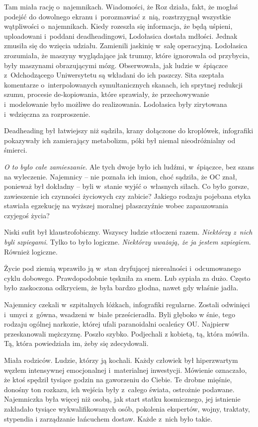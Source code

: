 \documentclass[oneside,polish,11pt,sfheadings]{mwbk}
\begin{document}
Tam miała rację o~najemnikach. Wiadomości, że Roz działa, fakt, że
mogłaś podejść do dowolnego ekranu i~porozmawiać z~nią, rozstrzygnął
wszystkie wątpliwości o~najemnikach. Kiedy rozeszła się informacja, że
będą uśpieni, uploadowani i~poddani deadheadingowi, Lodołasica dostała
mdłości. Jednak zmusiła się do wzięcia udziału. Zamienili jaskinię w~salę operacyjną. Lodołasica zrozumiała, że maszyny wyglądające jak
trumny, które ignorowała od przybycia, były maszynami obrazującymi mózg.
Obserwowała, jak ludzie w~śpiączce z~Odchodzącego Uniwersytetu są
wkładani do ich paszczy. Sita szeptała komentarze o~interpolowanych
symultanicznych skanach, ich sprytnej redukcji szumu, procesie
de-kopiowania, które sprawiały, że przechowywanie i~modelowanie było
możliwe do realizowania. Lodołasica były zirytowana i~wdzięczna za
rozproszenie.

Deadheading był łatwiejszy niż sądziła, krany dołączone do kroplówek,
infografiki pokazywały ich zamierający metabolizm, póki był niemal
nieodróżnialny od śmierci.

\textit{O to było całe zamieszanie}. Ale tych dwoje było ich ludźmi, w~śpiączce, bez szans na wyleczenie. Najemnicy -- nie poznała ich imion,
choć sądziła, że OC znał, ponieważ był dokładny -- byli w~stanie wyjść o~własnych siłach. Co było gorsze, zawieszenie ich czynności życiowych czy
zabicie? Jakiego rodzaju pojebana etyka stawiała egzekucję na wyższej
moralnej płaszczyźnie wobec zapauzowania czyjegoś życia?

Niski sufit był klaustrofobiczny. Wszyscy ludzie stłoczeni razem.
\textit{Niektórzy z~nich byli szpiegami}. Tylko to było logiczne.
\textit{Niektórzy uważają, że ja jestem szpiegiem}. Również logiczne.

Życie pod ziemią wprawiło ją w~stan dryfującej nierealności i~odcumowanego cyklu dobowego. Prawdopodobnie tęskniła za snem. Lub
sypiała za dużo. Często było zaskoczona odkryciem, że była bardzo
głodna, nawet gdy właśnie jadła.

Najemnicy czekali w~szpitalnych łóżkach, infografiki regularne. Zostali
odwinięci i~umyci z~gówna, wsadzeni w~białe prześcieradła. Byli głęboko
w śnie, tego rodzaju ogólnej narkozie, której ufali paranoidalni
ocaleńcy OU. Najpierw przeskanowali mężczyznę. Poszło szybko. Podjechali
z kobietą, tą, która mówiła. Tą, która powiedziała im, żeby się
zdecydowali.

Miała rodziców. Ludzie, którzy ją kochali. Każdy człowiek był
hiperzwartym węzłem intensywnej emocjonalnej i~materialnej inwestycji.
Mówienie oznaczało, że ktoś spędził tysiące godzin na gaworzeniu do
Ciebie. Te drobne mięśnie, donośny ton rozkazu, ich wejścia były z~całego świata, ostrożnie podawane. Najemniczka była więcej niż osobą,
jak start statku kosmicznego, jej istnienie zakładało tysiące
wykwalifikowanych osób, pokolenia ekspertów, wojny, traktaty, stypendia
i zarządzanie łańcuchem dostaw. Każde z~nich było takie.
\end{document}

